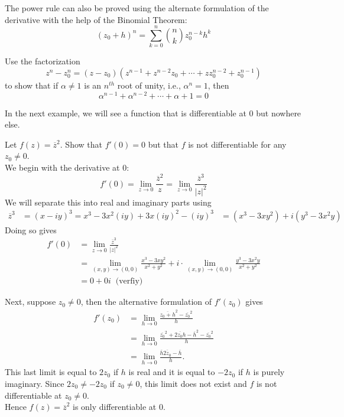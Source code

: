 \documentclass[handout]{ximera}
\begin{document}
\begin{remark}
The power rule can also be proved using the alternate formulation of the derivative with the help of the Binomial Theorem:
\[
(z_0 + h)^n = \sum_{k = 0}^n \binom{n}{k} z_0^{n-k} h^k
\]
\end{remark}


\begin{problem}
Use the factorization 
\[
z^n - z_0^n = (z-z_0)\left(z^{n-1} + z^{n-2}z_0 + \cdots + zz_0^{n-2} + z_0^{n-1} \right)
\]
to show that if $\alpha \neq 1$ is an $n^{th}$ root of unity, i.e., $\alpha^n = 1$, then
\[
\alpha^{n-1} + \alpha^{n-2} + \cdots + \alpha + 1 = 0
\]
\end{problem}

In the next example, we will see a function that is differentiable at $0$ but nowhere else.

\begin{example}
Let $f(z) = \overline{z}^2$.  Show that $f'(0) = 0$ but that $f$ is not differentiable for any $z_0 \neq 0$.\\
We begin with the derivative at $0$:
\[
f'(0) = \lim_{z \to  0} \frac{\overline{z}^2}{z} = \lim_{z \to  0} \frac{\overline{z}^3}{|z|^2}
\]
We will separate this into real and imaginary parts using 
\begin{align*}
\overline{z}^3 &= (x -iy)^3 = x^3 - 3x^2(iy) + 3x(iy)^2  - (iy)^3 
              &= (x^3 -3xy^2) + i(y^3 - 3x^2y)
\end{align*}
Doing so gives
\begin{align*}
f'(0) &= \lim_{z \to  0} \frac{\overline{z}^3}{|z|^2}\\
      &= \lim_{(x,y) \to (0,0)} \frac{x^3 -3xy^2}{x^2 +y^2} + i\cdot \lim_{(x,y) \to (0,0)} \frac{y^3 - 3x^2y}{x^2 +y^2}\\
      & = 0 + 0i \;\; \mbox{(verfiy)}
\end{align*}

Next, suppose $z_0 \neq 0$, then the alternative formulation of $f'(z_0)$ gives
\begin{align*}
f'(z_0) &= \lim_{h \to 0} \frac{\overline{z_0 + h}^2-\overline{z_0}^2 }{h}\\[6pt]
        &=\lim_{h \to 0} \frac{\overline{z_0}^2 +\overline{2z_0h}- \overline{h}^2 -\overline{z_0}^2 }{h}\\[6pt]
        &=\lim_{h \to 0} \frac{\overline{h} \overline{2z_0}- \overline{h}}{h}.
\end{align*}
This last limit is equal to $2z_0$ if $h$ is real and it is equal to $-2z_0$ if $h$ is purely imaginary.
Since $2z_0 \neq -2z_0$ if $z_0 \neq 0$, this limit does not exist and $f$ is not differentiable at $z_0 \neq 0$.\\
Hence $f(z) = \overline{z}^2$ is only differentiable at $0$.

\end{example}
\end{document}
